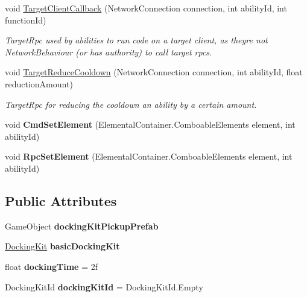 \begin{DoxyCompactItemize}
void \hyperlink{class_docking_ad341303ed88d02d37ccd165ab5bef8bb}{Target\+Client\+Callback} (Network\+Connection connection, int ability\+Id, int function\+Id)
\begin{DoxyCompactList}\small\item\em Target\+Rpc used by abilities to run code on a target client, as they\textquotesingle{}re not Network\+Behaviour (or has authority) to call target rpcs. \end{DoxyCompactList}\item 
void \hyperlink{class_docking_a9416a6bbad0e1fff0a238191db445a8b}{Target\+Reduce\+Cooldown} (Network\+Connection connection, int ability\+Id, float reduction\+Amount)
\begin{DoxyCompactList}\small\item\em Target\+Rpc for reducing the cooldown an ability by a certain amount. \end{DoxyCompactList}\item 
\hypertarget{class_docking_a48b37263f82d0a5950999808923767dc}{}\label{class_docking_a48b37263f82d0a5950999808923767dc} 
void {\bfseries Cmd\+Set\+Element} (Elemental\+Container.\+Comboable\+Elements element, int ability\+Id)
\item 
\hypertarget{class_docking_a6ba3b9c3f54851c9f05934b5ea50955f}{}\label{class_docking_a6ba3b9c3f54851c9f05934b5ea50955f} 
void {\bfseries Rpc\+Set\+Element} (Elemental\+Container.\+Comboable\+Elements element, int ability\+Id)
\end{DoxyCompactItemize}
\subsection*{Public Attributes}
\begin{DoxyCompactItemize}
\item 
\hypertarget{class_docking_a3702734a6bede75d477024c9a4ee57f2}{}\label{class_docking_a3702734a6bede75d477024c9a4ee57f2} 
Game\+Object {\bfseries docking\+Kit\+Pickup\+Prefab}
\item 
\hypertarget{class_docking_a8990a0a8a8493ebeb3d4768f5dfdfc82}{}\label{class_docking_a8990a0a8a8493ebeb3d4768f5dfdfc82} 
\hyperlink{class_docking_kit}{Docking\+Kit} {\bfseries basic\+Docking\+Kit}
\item 
\hypertarget{class_docking_a3f0b93343fef983edfec04c7323c9126}{}\label{class_docking_a3f0b93343fef983edfec04c7323c9126} 
float {\bfseries docking\+Time} = 2f
\item 
\hypertarget{class_docking_a853239b43039089072f1546493fdc62b}{}\label{class_docking_a853239b43039089072f1546493fdc62b} 
Docking\+Kit\+Id {\bfseries docking\+Kit\+Id} = Docking\+Kit\+Id.\+Empty
\end{DoxyCompactItemize}


